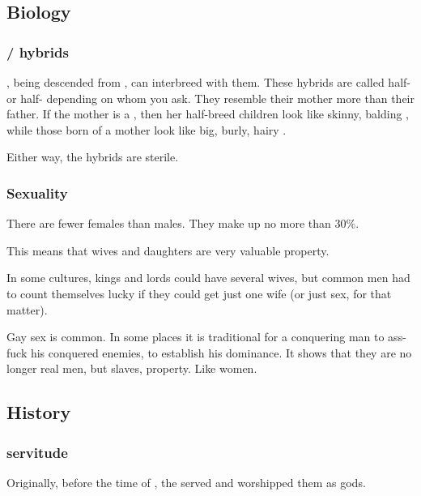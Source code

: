 \subsection{Biology}




\subsubsection{\Nephil/\human{} hybrids}
\Humans, being descended from \nephilim, can interbreed with them. 
These hybrids are called half-\humans{} or half-\nephilim{} depending on whom you ask. 
They resemble their mother more than their father. 
If the mother is a \nephil, then her half-breed children look like skinny, balding \nephilim{}, while those born of a \human{} mother look like big, burly, hairy \humans. 

Either way, the hybrids are sterile. 





\subsubsection{Sexuality}
There are fewer \nephilic{} females than males. 
They make up no more than $30\%$. 

This means that wives and daughters are very valuable property. 

In some cultures, kings and lords could have several wives, but common men had to count themselves lucky if they could get just one wife (or just sex, for that matter). 

Gay sex is common. 
In some places it is traditional for a conquering man to ass-fuck his conquered enemies, to establish his dominance. 
It shows that they are no longer real men, but slaves, property. 
Like women. 









\subsection{History}
\subsubsection{\Ophidian{} servitude}
Originally, before the time of \Kserasshana, the \nephilim{} served  \ophidians{} and worshipped them as gods. 

